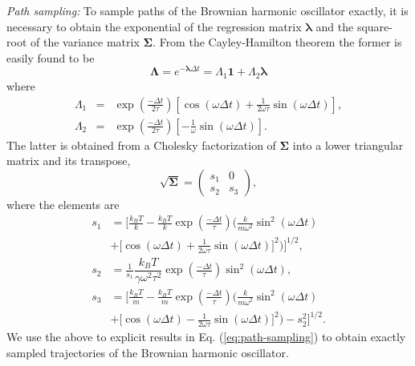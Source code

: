 \documentclass[english,aps, twocolumn, pre,superscriptaddress, notitlepage]{revtex4-1}
\begin{document}
\emph{Path sampling: }To sample paths of the Brownian harmonic oscillator
exactly, it is necessary to obtain the exponential of the regression
matrix $\boldsymbol{\lambda}$ and the square-root of the variance
matrix $\boldsymbol{\Sigma}$. From the Cayley-Hamilton theorem the
former is easily found to be
\begin{equation}
\boldsymbol{\Lambda=}e^{-\boldsymbol{\lambda}\Delta t}=\Lambda_{1}\boldsymbol{1}+\Lambda_{2}\boldsymbol{\lambda}
\end{equation}
where\begin{subequations}
\begin{eqnarray}
\Lambda_{1} & = & \exp(\tfrac{-\Delta t}{2\tau})\left[\cos(\omega\Delta t)+\frac{1}{2\omega\tau}\sin(\omega\Delta t)\right],\\
\Lambda_{2} & = & \exp(\tfrac{-\Delta t}{2\tau})\left[-\frac{1}{\omega}\sin(\omega\Delta t)\right].
\end{eqnarray}
\end{subequations}The latter is obtained from a Cholesky factorization
of $\boldsymbol{\Sigma}$ into a lower triangular matrix and its transpose,
\begin{equation}
\sqrt{\boldsymbol{\Sigma}}=\begin{pmatrix}s_{1} & 0\\
s_{2} & s_{3}
\end{pmatrix},
\end{equation}
where the elements are\begin{subequations}
\begin{align}
s_{1} & =\bigg[\frac{k_{B}T}{k}-\frac{k_{B}T}{k}\exp(\tfrac{-\Delta t}{\tau})\Big(\frac{k}{m\omega^{2}}\sin^{2}(\omega\Delta t)\nonumber \\
 & +\big[\cos(\omega\Delta t)+\tfrac{1}{2\omega\tau}\sin(\omega\Delta t)\big]^{2}\Big)\bigg]^{1/2},\\
s_{2} & =\frac{1}{s_{1}}\dfrac{k_{B}T}{\gamma\omega^{2}\tau^{2}}\exp(\tfrac{-\Delta t}{\tau})\sin^{2}(\omega\Delta t),\\
s_{3} & =\bigg[\frac{k_{B}T}{m}-\frac{k_{B}T}{m}\exp(\tfrac{-\Delta t}{\tau})\Big(\frac{k}{m\omega^{2}}\sin^{2}(\omega\Delta t)\nonumber \\
 & +\big[\cos(\omega\Delta t)-\tfrac{1}{2\omega\tau}\sin(\omega\Delta t)\big]^{2}\Big)-s_{2}^{2}\bigg]^{1/2}.
\end{align}
\end{subequations}We use the above to explicit results in Eq. (\ref{eq:path-sampling})
to obtain exactly sampled trajectories of the Brownian harmonic oscillator. 
\end{document}
